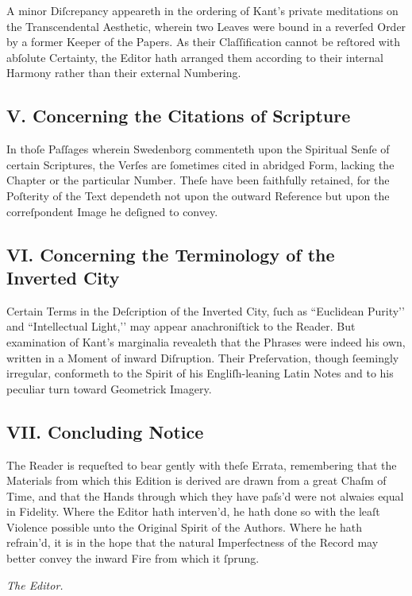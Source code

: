\documentclass[12pt]{article}
\begin{document}
A minor Diſcrepancy appeareth in the ordering of Kant’s private meditations 
on the Transcendental Aesthetic, wherein two Leaves were bound in a reverſed 
Order by a former Keeper of the Papers. As their Claſſification cannot be 
reſtored with abſolute Certainty, the Editor hath arranged them according to 
their internal Harmony rather than their external Numbering.

\subsection*{V. Concerning the Citations of Scripture}
In thoſe Paſſages wherein Swedenborg commenteth upon the Spiritual Senſe of 
certain Scriptures, the Verſes are ſometimes cited in abridged Form, lacking 
the Chapter or the particular Number. Theſe have been faithfully retained, 
for the Poſterity of the Text dependeth not upon the outward Reference but 
upon the correſpondent Image he deſigned to convey.

\subsection*{VI. Concerning the Terminology of the Inverted City}
Certain Terms in the Deſcription of the Inverted City, ſuch as ``Euclidean 
Purity’’ and ``Intellectual Light,’’ may appear anachroniſtick to the Reader. 
But examination of Kant’s marginalia revealeth that the Phrases were indeed 
his own, written in a Moment of inward Diſruption. Their Preſervation, though 
ſeemingly irregular, conformeth to the Spirit of his Engliſh-leaning Latin 
Notes and to his peculiar turn toward Geometrick Imagery.

\subsection*{VII. Concluding Notice}
The Reader is requeſted to bear gently with theſe Errata, remembering that 
the Materials from which this Edition is derived are drawn from a great 
Chaſm of Time, and that the Hands through which they have paſs’d 
were not alwaies equal in Fidelity. Where the Editor hath interven’d, he 
hath done so with the leaſt Violence possible unto the Original Spirit of 
the Authors. Where he hath refrain’d, it is in the hope that the natural 
Imperfectness of the Record may better convey the inward Fire from which it 
ſprung.

\begin{flushright}
\textit{The Editor.}
\end{flushright}
\end{document}

